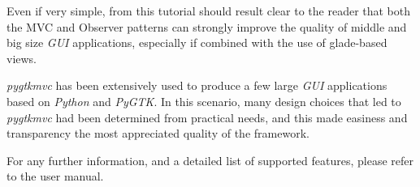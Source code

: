 \documentclass{article}
\newcommand{\kw}[1]{\emph{#1}\xspace}
\newcommand{\appl}[1]{\textsl{#1}\xspace}
\newcommand{\pygtk}{\appl{PyGTK}}
\newcommand{\python}{\appl{Python}}
\newcommand{\gui}{\kw{GUI}}
\newcommand{\pygtkmvc}{\kw{pygtkmvc}}
\begin{document}
Even if very simple, from this tutorial should result clear to the
reader that both the MVC and Observer patterns can strongly improve
the quality of middle and big size \gui applications, especially if
combined with the use of glade-based views.

\pygtkmvc has been extensively used to produce a few large \gui
applications based on \python and \pygtk. In this scenario, many
design choices that led to \pygtkmvc had been determined from
practical needs, and this made easiness and transparency the most
appreciated quality of the framework.

For any further information, and a detailed list of supported
features, please refer to the user manual. 
\end{document}
